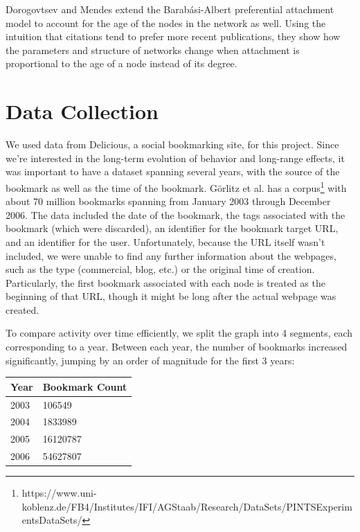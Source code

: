\documentclass[11pt]{amsart}
\begin{document}
Dorogovtsev and Mendes \cite{aging} extend the Barab\'{a}si-Albert preferential attachment \cite{barabasi} model to account for the age of the nodes in the network as well. Using the intuition that citations tend to prefer more recent publications, they show how the parameters and structure of networks change when attachment is proportional to the age of a node instead of its degree.

\section{Data Collection}
We used data from Delicious, a social bookmarking site, for this project. Since we're interested in the long-term evolution of behavior and long-range effects, it was important to have a dataset spanning several years, with the source of the bookmark as well as the time of the bookmark. G\"orlitz et al. \cite{goerlitz} has a corpus\footnote{https://www.uni-koblenz.de/FB4/Institutes/IFI/AGStaab/Research/DataSets/PINTSExperimentsDataSets/} with about 70 million bookmarks spanning from January 2003 through December 2006. The data included the date of the bookmark, the tags associated with the bookmark (which were discarded), an identifier for the bookmark target URL, and an identifier for the user. Unfortunately, because the URL itself wasn't included, we were unable to find any further information about the webpages, such as the type (commercial, blog, etc.) or the original time of creation. Particularly, the first bookmark associated with each node is treated as the beginning of that URL, though it might be long after the actual webpage was created.

To compare activity over time efficiently, we split the graph into 4 segments, each corresponding to a year. Between each year, the number of bookmarks increased significantly, jumping by an order of magnitude for the first 3 years:

\vspace{10pt}

\begin{tabular}{| l | l |}
 \hline
Year & Bookmark Count \\ \hline
2003 & 106549\\ \hline
2004 & 1833989 \\ \hline
2005 & 16120787 \\ \hline
2006 & 54627807 \\ \hline
\end{tabular}

\vspace{10pt}
\end{document}
